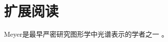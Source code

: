 \section{扩展阅读}\label{sec:扩展阅读05}

Meyer是最早严密研究图形学中光谱表示的学者之一
\citep{10.1145/800250.807502}\citep{10.1145/7529.7920}。